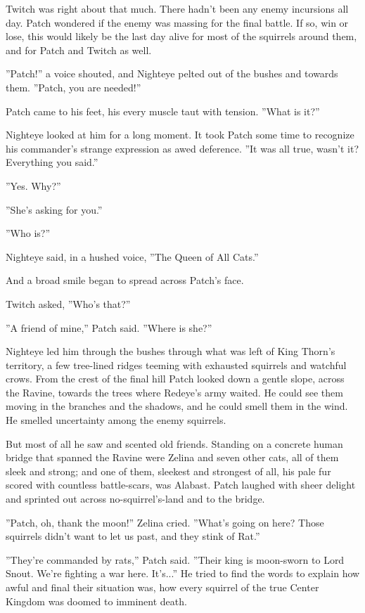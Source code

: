 \documentclass[11pt]{article}
\begin{document}
 Twitch was right about that much. There hadn't been any enemy incursions all day. Patch wondered if the enemy was massing for the final battle. If so, win or lose, this would likely be the last day alive for most of the squirrels around them, and for Patch and Twitch as well.\par
 ''Patch!'' a voice shouted, and Nighteye pelted out of the bushes and towards them. ''Patch, you are needed!''\par
 Patch came to his feet, his every muscle taut with tension. ''What is it?''\par
 Nighteye looked at him for a long moment. It took Patch some time to recognize his commander's strange expression as awed deference. ''It was all true, wasn't it? Everything you said.''\par
 ''Yes. Why?''\par
 ''She's asking for you.''\par
 ''Who is?''\par
 Nighteye said, in a hushed voice, ''The Queen of All Cats.''\par
 And a broad smile began to spread across Patch's face.\par
 Twitch asked, ''Who's that?''\par
 ''A friend of mine,'' Patch said. ''Where is she?''\par
 Nighteye led him through the bushes through what was left of King Thorn's territory, a few tree-lined ridges teeming with exhausted squirrels and watchful crows. From the crest of the final hill Patch looked down a gentle slope, across the Ravine, towards the trees where Redeye's army waited. He could see them moving in the branches and the shadows, and he could smell them in the wind. He smelled uncertainty among the enemy squirrels.\par
 But most of all he saw and scented old friends. Standing on a concrete human bridge that spanned the Ravine were Zelina and seven other cats, all of them sleek and strong; and one of them, sleekest and strongest of all, his pale fur scored with countless battle-scars, was Alabast. Patch laughed with sheer delight and sprinted out across no-squirrel's-land and to the bridge.\par
 ''Patch, oh, thank the moon!'' Zelina cried. ''What's going on here? Those squirrels didn't want to let us past, and they stink of Rat.''\par
 ''They're commanded by rats,'' Patch said. ''Their king is moon-sworn to Lord Snout. We're fighting a war here. It's...'' He tried to find the words to explain how awful and final their situation was, how every squirrel of the true Center Kingdom was doomed to imminent death.\par
\end{document}
